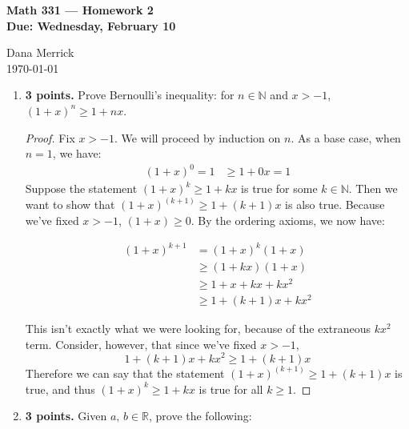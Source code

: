 \documentclass[12pt]{amsart}
\begin{document}
\thispagestyle{empty}

\begin{center}
{\bf Math 331  --- Homework 2 \\
Due:  Wednesday, February 10}
\end{center}

\bigskip

\noindent
Dana Merrick \\
\today

\bigskip

\begin{enumerate}

\setlength{\itemsep}{6pt}

\addtocounter{enumi}{1}

\item {\bf 3 points.} Prove Bernoulli's inequality:   for $n\in \mathbb N$ and $x>-1$, $(1+x)^n\geq 1+nx$.

\begin{proof}
Fix $x>-1$. We will proceed by induction on $n$. As a base case, when $n=1$, we have:
\begin{align*}
(1+x)^0= 1 &\geq 1+0x = 1
\end{align*}
Suppose the statement $(1+x)^k\geq 1+kx$ is true for some $k\in\mathbb N$. Then we want to show that $(1+x)^{(k+1)}\geq 1+(k+1)x$ is also true. Because we've fixed $x>-1$, $(1+x) \geq 0$. By the ordering axioms, we now have:

\begin{align*}
(1+x)^{k+1}&= (1+x)^k(1+x) \\
&\geq (1+kx)(1+x) \\
&\geq 1 + x + kx + kx^2 \\
&\geq 1 + (k+1)x + kx^2
\end{align*}

This isn't exactly what we were looking for, because of the extraneous $kx^2$ term. Consider, however, that since we've fixed $x>-1$,
\[1 + (k + 1)x + kx^2 \geq 1 + (k + 1)x \]
Therefore we can say that the statement $(1+x)^{(k+1)}\geq 1 + (k+1)x$ is true, and thus $(1+x)^k\geq 1+kx$ is true for all $k\geq 1$.
\end{proof}

\addtocounter{enumi}{1}

\item {\bf 3 points.} Given $a,\,b\in \mathbb R$, prove the following:
%
\begin{enumerate}


\end{enumerate}
\end{enumerate}
\end{document}
